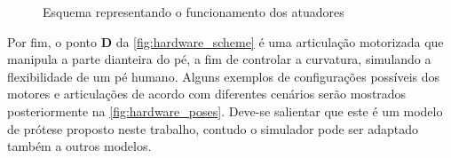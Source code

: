 \begin{figure}[ht]
	\caption{\label{fig:hardware_scheme}Esquema representando o funcionamento dos atuadores}
	\begin{center}
	\end{center}
\end{figure}

Por fim, o ponto \textbf{D} da \autoref{fig:hardware_scheme} é uma articulação motorizada que manipula a parte dianteira do pé, a fim de controlar a curvatura, simulando a flexibilidade de um pé humano. Alguns exemplos de configurações possíveis dos motores e articulações de acordo com diferentes cenários serão mostrados posteriormente na \autoref{fig:hardware_poses}. Deve-se salientar que este é um modelo de prótese proposto neste trabalho, contudo o simulador pode ser adaptado também a outros modelos.


% 
% 

